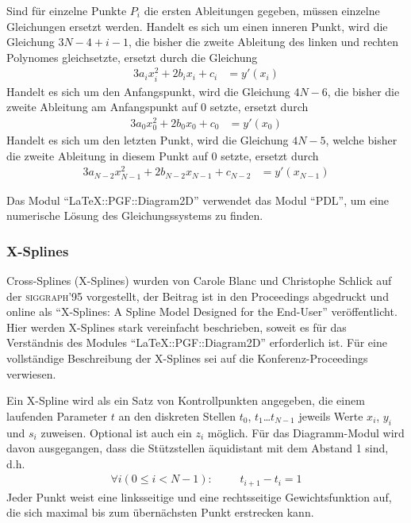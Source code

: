 \documentclass[ngerman,origlongtable]{scrartcl}
\begin{document}
Sind für einzelne Punkte \(P_i\) die ersten Ableitungen gegeben,
müssen einzelne Gleichungen ersetzt werden.
Handelt es sich um einen inneren Punkt, wird die Gleichung
\(3N-4+i-1\),
die bisher die zweite Ableitung des linken und rechten Polynomes gleichsetzte,
ersetzt durch die Gleichung
\begin{align*}3a_ix_i^2+2b_ix_i+c_i&=y'(x_i)\end{align*}
Handelt es sich um den Anfangspunkt, wird die Gleichung \(4N-6\), die
bisher die zweite Ableitung am Anfangspunkt auf 0 setzte, ersetzt durch
\begin{align*}3a_0x_0^2+2b_0x_0+c_0&=y'(x_0)\end{align*}
Handelt es sich um den letzten Punkt, wird die Gleichung \(4N-5\), welche
bisher die zweite Ableitung in diesem Punkt auf 0 setzte, ersetzt durch
\begin{align*}3a_{N-2}x_{N-1}^2+2b_{N-2}x_{N-1}+c_{N-2}&=y'(x_{N-1})\end{align*}

Das Modul "`LaTeX::PGF::Diagram2D"' verwendet das Modul "`PDL"', um eine numerische
Lösung des Gleichungssystems zu finden.
\clearpage
\subsubsection{X-Splines}
Cross-Splines (X-Splines) wurden von Carole Blanc und Christophe Schlick
auf der \textsc{siggraph}'95 vorgestellt, der Beitrag ist in den
Proceedings abgedruckt und online als "`X-Splines: A Spline Model
Designed for the End-User"' veröffentlicht.\\
Hier werden X-Splines stark vereinfacht beschrieben, soweit es für das
Verständnis des Modules "`LaTeX::PGF::Diagram2D"' erforderlich ist. Für eine
vollständige Beschreibung der X-Splines sei auf die Konferenz-Proceedings
verwiesen.

Ein X-Spline wird als ein Satz von Kontrollpunkten angegeben,
die einem laufenden Parameter \(t\) an den diskreten Stellen
\(t_0\), \(t_1\)\ldots{}\(t_{N-1}\) jeweils Werte \(x_i\), \(y_i\) und
\(s_i\) zuweisen. Optional ist auch ein \(z_i\) möglich.
Für das Diagramm-Modul wird davon ausgegangen, dass die Stützstellen
äquidistant mit dem Abstand 1 sind, d.h.
\begin{align*}\forall i(0\leq i<N-1):&&&t_{i+1}-t_{i}=1\end{align*}
Jeder Punkt weist eine linksseitige und eine rechtsseitige Gewichtsfunktion
auf, die sich maximal bis zum übernächsten Punkt erstrecken kann.
\end{document}
